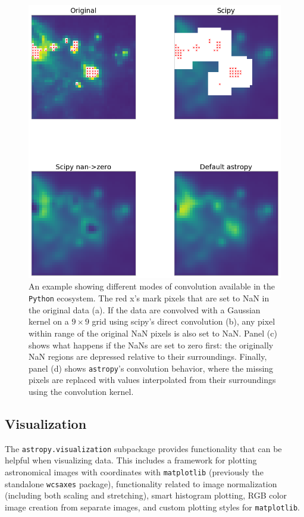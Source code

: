 \documentclass[modern]{aastex61}
\newcommand{\package}[1]{\texttt{#1}\xspace}
\newcommand{\python}{\package{Python}}
\newcommand{\astropypkg}{\package{astropy}}
\begin{document}
\begin{figure}
\includegraphics[width=\textwidth]{convolution_example.png}
\caption{%
    An example showing different modes of convolution available in the \python
    ecosystem.  The red x's mark pixels that are set to NaN in the original data
    (a).  If the data are convolved with a Gaussian kernel on a $9\times 9$ grid using
    scipy's direct convolution (b), any pixel within range of the original NaN
    pixels is also set to NaN.  Panel (c) shows what happens if the NaNs are set
    to zero first: the originally NaN regions are depressed relative to their
    surroundings.  Finally, panel (d) shows \astropypkg's convolution behavior,
    where the missing pixels are replaced with values interpolated from their
    surroundings using the convolution kernel.
    \label{fig:convolution-example}
}
\end{figure}


\subsection{Visualization}

The \package{astropy.visualization} subpackage provides functionality that can be helpful when visualizing data. This includes a framework for plotting astronomical images with coordinates with \package{matplotlib} (previously the standalone \package{wcsaxes} package), functionality related to image normalization (including both scaling and stretching), smart histogram plotting, RGB color image creation from separate images, and custom plotting styles for \package{matplotlib}.
\end{document}
